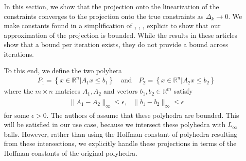 \documentclass{article}
\theoremstyle{case}
\numberwithin{theorem}{subsection}
\newcommand{\dk}{\Delta_k}
\newcommand{\Rm}{\mathbb R^m}
\newcommand{\Rn}{\mathbb R^n}
\begin{document}
In this section, we show that the projection onto the linearization of the constraints converges to the projection onto the true constraints as $\dk \to 0$.
We make constants found in a simplification of 
\cite{pena2020new},
\cite{hoffman_theorem},
\cite{continuity_of_metric_projections},
\cite{perturbations_of_linear_inequalities} 
explicit to show that our approximation of the projection is bounded.
While the results in these articles show that a bound per iteration exists, they do not provide a bound across iterations.

To this end, we define the two polyhera
\begin{align}
\label{bap_define_the_polyhedra}
P_1 = \left\{ x \in \Rn | A_1x\le b_1 \right\}
\quad \textrm{and} \quad
P_2 = \left\{ x \in \Rn | A_2x\le b_2 \right\}
\end{align}
where the $m\times n$ matrices $A_1, A_2$ and vectors $b_1, b_2 \in \Rm$ satisfy
\begin{align}
\begin{array}{cc}
\|A_1 - A_2\|_{\infty} \le \epsilon, & \|b_1 - b_2\|_{\infty} \le \epsilon
\label{bap_polyhedra_are_close}
\end{array}
\end{align}
for some $\epsilon > 0$.
The authors of \cite{continuity_of_metric_projections} assume that these polyhedra are bounded.
This will be satisfied in our use case, because we intersect these polyhedra with $L_{\infty}$ balls.
However, rather than using the Hoffman constant of polyhedra resulting from these intersections,
we explicitly handle these projections in terms of the Hoffman constants of the original polyhedra.

% 
% 
% 
\end{document}
